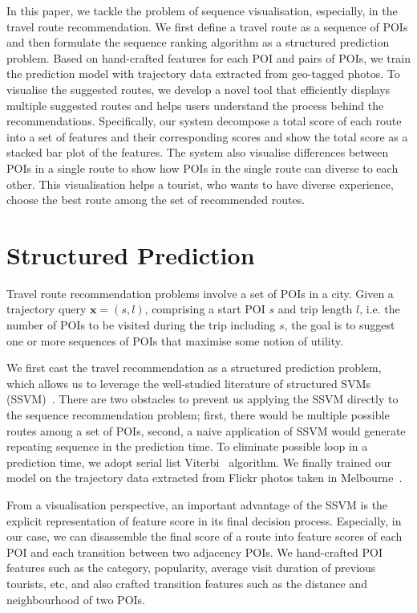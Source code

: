 \documentclass[sigconf]{acmart}
\begin{document}
In this paper, we tackle the problem of sequence visualisation, especially, in the travel route recommendation. We first define a travel route as a sequence of POIs and then formulate the sequence ranking algorithm as a structured prediction problem. Based on hand-crafted features for each POI and pairs of POIs, we train the prediction model with trajectory data extracted from geo-tagged photos. To visualise the suggested routes, we develop a novel tool that efficiently displays multiple suggested routes and helps users understand the process behind the recommendations. Specifically, our system decompose a total score of each route into a set of features and their corresponding scores and show the total score as a stacked bar plot of the features. The system also visualise differences between POIs in a single route to show how POIs in the single route can diverse to each other. This visualisation helps a tourist, who wants to have diverse experience, choose the best route among the set of recommended routes.

\section{Structured Prediction}
Travel route recommendation problems involve a set of POIs in a city. Given a trajectory query $\mathbf{x} = (s, l)$, comprising a start POI $s$ and trip length $l$, i.e. the number of POIs to be visited during the trip including $s$, the goal is to suggest one or more sequences of POIs that maximise some notion of utility.

We first cast the travel recommendation as a structured prediction problem, which allows us to leverage the well-studied literature of structured SVMs (SSVM)~\cite{tsochantaridis2005large,joachims2009predicting}. There are two obstacles to prevent us applying the SSVM directly to the sequence recommendation problem; first, there would be multiple possible routes among a set of POIs, second, a naive application of SSVM would generate repeating sequence in the prediction time. 
To eliminate possible loop in a prediction time, we adopt serial list Viterbi~\cite{seshadri1994list,nill1995list} algorithm.
We finally trained our model on the trajectory data extracted from Flickr photos taken in Melbourne~\cite{chen2016learning}.

From a visualisation perspective, an important advantage of the SSVM is the explicit representation of feature score in its final decision process. Especially, in our case, we can disassemble the final score of a route into feature scores of each POI and each transition between two adjacency POIs. We hand-crafted POI features such as the category, popularity, average visit duration of previous tourists, etc, and also crafted transition features such as the distance and neighbourhood of two POIs.
\end{document}
